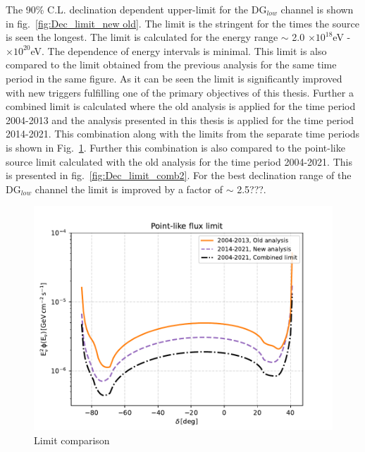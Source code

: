 The 90\% C.L. declination dependent upper-limit for the DG$_{low}$ channel is shown in fig.~\ref{fig:Dec_limit_new old}. The limit is the stringent for the times the source is seen the longest. The limit is calculated for the energy range $\sim$ 2.0 $\times 10^{18}$eV - $\times 10^{20}$eV. The dependence of energy intervals is minimal. This limit is also compared to the limit obtained from the previous analysis for the same time period in the same figure. As it can be seen the limit is significantly improved with new triggers fulfilling one of the primary objectives of this thesis. Further a combined limit is calculated where the old analysis is applied for the time period 2004-2013 and the analysis presented in this thesis is applied for the time period 2014-2021. This combination along with the limits from the separate time periods is shown in Fig.~\ref{fig:Dec_limit_comb1}. Further this combination is also compared to the point-like source limit calculated with the old analysis for the time period 2004-2021. This is presented in fig.~\ref{fig:Dec_limit_comb2}. For the best declination range of the DG$_{low}$ channel the limit is improved by a factor of $\sim$ 2.5???.

\begin{figure}[t!]
  \centering
  \includegraphics[width=14.5cm]{thesis_figures/PointLimits/Point_comp_combined.pdf}
  \caption{Limit comparison}
  \label{fig:Dec_limit_comb1}
\end{figure}

